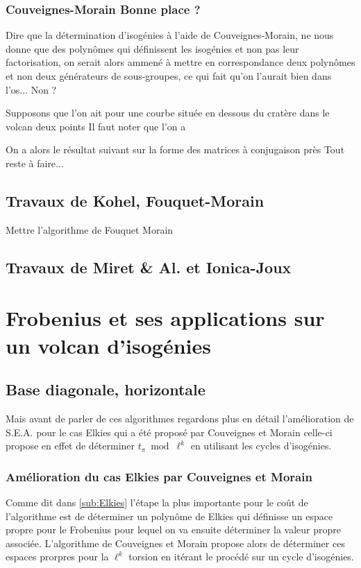 \documentclass[10pt,a4paper]{book}
\theoremstyle{plain}
\theoremstyle{definition}
\theoremstyle{definition}
\theoremstyle{definition}
\theoremstyle{definition}
\theoremstyle{remark}
\theoremstyle{remark}
\theoremstyle{definition}
\begin{document}
\subsubsection{Couveignes-Morain Bonne place ?}

Dire que la détermination d'isogénies à l'aide de Couveignes-Morain, ne nous donne que des polynômes qui définissent les isogénies et non pas leur factorisation, on serait alors ammené à mettre en correspondance deux polynômes et non deux générateurs de sous-groupes, ce qui fait qu'on l'aurait bien dans l'os... Non ?

Supposons que l'on ait pour une courbe située en dessous du cratère dans le volcan deux points  Il faut noter que l'on a 

On a alors le résultat suivant sur la forme des matrices à conjugaison près
Tout reste à faire...

\subsection{Travaux de Kohel, Fouquet-Morain}
Mettre l'algorithme de Fouquet Morain
\subsection{Travaux de Miret \& Al. et Ionica-Joux}


\section{Frobenius et ses applications sur un volcan d'isogénies}
\subsection{Base diagonale, horizontale}
Mais avant de parler de ces algorithmes regardons plus en détail l'amélioration de S.E.A. pour le cas Elkies qui a été proposé par Couveignes et Morain \cite{Couveignes96isogenycycles} celle-ci propose en effet de déterminer $t_{\pi} \bmod \ell^k$ en utilisant les cycles d'isogénies. 

\subsubsection{Amélioration du cas Elkies par Couveignes et Morain}
Comme dit dans \ref{sub:Elkies} l'étape la plus importante pour le coût de l'algorithme est de déterminer un polynôme de Elkies qui définisse un espace propre pour le Frobenius pour lequel on va ensuite déterminer la valeur propre associée. L'algorithme de Couveignes et Morain propose alors de déterminer ces espaces prorpres pour la $\ell^k$ torsion en itérant le procédé sur un cycle d'isogénies.
\end{document}
